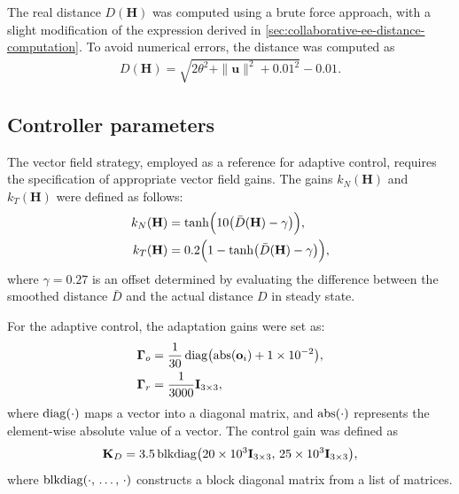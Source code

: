 The real distance $D(\mathbf{H})$ was computed using a brute force approach, with a slight modification of the expression derived in \cref{sec:collaborative-ee-distance-computation}. To avoid numerical errors, the distance was computed as
\begin{align}
    D(\mathbf{H}) = \sqrt{2\theta^2 + \|\mathbf{u}\|^2 + 0.01^2} - 0.01.
\end{align}

\subsection{Controller parameters}
The vector field strategy, employed as a reference for adaptive control, requires the specification of appropriate vector field gains. The gains $k_N(\mathbf{H})$ and $k_T(\mathbf{H})$ were defined as follows:
\begin{align}
    k_N(\mathbf{H}) &= \tanh\Bigl(10\bigl(\bar{D}(\mathbf{H})- \gamma\bigr)\Bigr),\\
    k_T(\mathbf{H}) &= 0.2\Bigl(1 - \tanh\bigl(\bar{D}(\mathbf{H}) - \gamma\bigr)\Bigr),
\end{align}
where $\gamma=0.27$ is an offset determined by evaluating the difference between the smoothed distance $\bar{D}$ and the actual distance $D$ in steady state.

For the adaptive control, the adaptation gains were set as:
\begin{align}
    \boldsymbol{\Gamma}_o &= \frac{1}{30}\operatorname{diag}\bigl(\operatorname{abs}(\mathbf{o}_i) + \num{1E-2}\bigr),\\
    \boldsymbol{\Gamma}_r &= \frac{1}{3000}\mathbf{I}_{3\times3},
\end{align}
where $\operatorname{diag}(\cdot)$ maps a vector into a diagonal matrix, and $\operatorname{abs}(\cdot)$ represents the element-wise absolute value of a vector. The control gain was defined as
\begin{align}
    \mathbf{K}_D = 3.5\operatorname{blkdiag}\bigl(\num{20E3}\mathbf{I}_{3\times3},\, \num{25E3}\mathbf{I}_{3\times3}\bigr),
\end{align}
where $\operatorname{blkdiag}(\cdot,\, \dots,\, \cdot)$ constructs a block diagonal matrix from a list of matrices.
